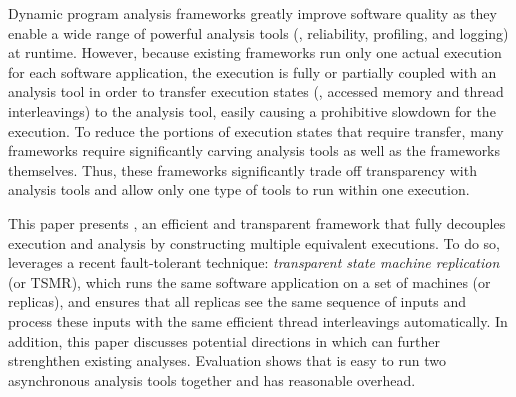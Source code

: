 
Dynamic program analysis frameworks greatly improve software quality as
they enable a wide range of powerful analysis tools (\eg, reliability,
profiling, and logging) at runtime. However, because existing frameworks run
only one actual execution for each software application, the execution is fully
or partially coupled with an analysis tool in order to transfer execution states
(\eg, accessed memory and thread interleavings) to the analysis tool, easily
causing a prohibitive slowdown for the execution. To reduce the portions of
execution states that require transfer, many frameworks require significantly
carving analysis tools as well as the frameworks themselves. Thus, these
frameworks significantly trade off transparency with analysis tools and allow
only one type of tools to run within one execution.


This paper presents \xxx, an efficient and transparent framework that fully 
decouples execution and analysis by constructing multiple equivalent 
executions. To do so, \xxx leverages a recent fault-tolerant technique: 
\emph{transparent state machine replication} (or TSMR), which runs the same 
software application on a set of machines (or replicas), and ensures that 
all replicas see the same sequence of inputs and process these inputs with 
the same efficient thread interleavings automatically. In addition, this paper 
discusses potential directions in which \xxx can further strenghthen existing 
analyses. Evaluation shows that \xxx is easy to run two asynchronous 
analysis tools together and has reasonable overhead.
